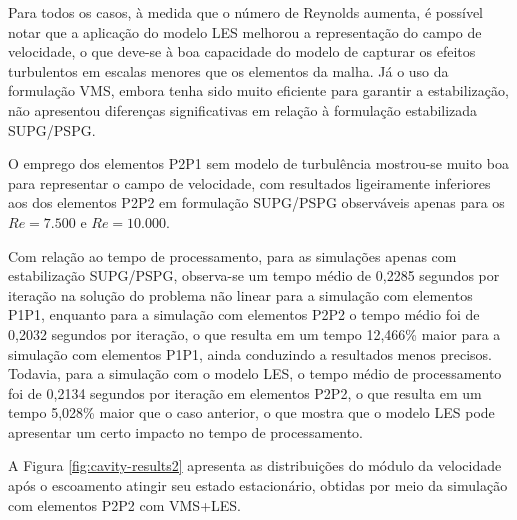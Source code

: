 Para todos os casos, à medida que o número de Reynolds aumenta, é possível notar que a aplicação do modelo LES melhorou a representação do campo de velocidade, o que deve-se à boa capacidade do modelo de capturar os efeitos turbulentos em escalas menores que os elementos da malha. Já o uso da formulação VMS, embora tenha sido muito eficiente para garantir a estabilização, não apresentou diferenças significativas em relação à formulação estabilizada SUPG/PSPG.

O emprego dos elementos P2P1 sem modelo de turbulência mostrou-se muito boa para representar o campo de velocidade, com resultados ligeiramente inferiores aos dos elementos P2P2 em formulação SUPG/PSPG observáveis apenas para os $Re=7.500$ e $Re=10.000$.

Com relação ao tempo de processamento, para as simulações apenas com estabilização SUPG/PSPG, observa-se um tempo médio de 0,2285 segundos por iteração na solução do problema não linear para a simulação com elementos P1P1, enquanto para a simulação com elementos P2P2 o tempo médio foi de 0,2032 segundos por iteração, o que resulta em um tempo 12,466\% maior para a simulação com elementos P1P1, ainda conduzindo a resultados menos precisos. Todavia, para a simulação com o modelo LES, o tempo médio de processamento foi de 0,2134 segundos por iteração em elementos P2P2, o que resulta em um tempo 5,028\% maior que o caso anterior, o que mostra que o modelo LES pode apresentar um certo impacto no tempo de processamento.

A Figura \ref{fig:cavity-results2} apresenta as distribuições do módulo da velocidade após o escoamento atingir seu estado estacionário, obtidas por meio da simulação com elementos P2P2 com VMS+LES.

